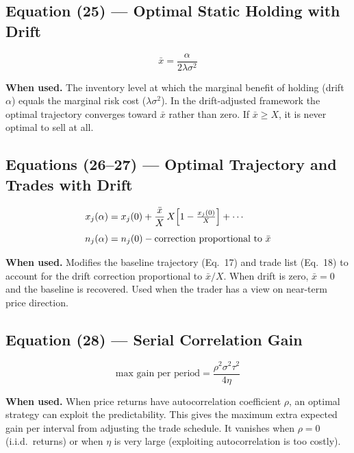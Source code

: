 \documentclass[11pt,a4paper]{article}
\begin{document}
\subsection*{Equation (25) — Optimal Static Holding with Drift}

\begin{equation}
  \bar{x} = \frac{\alpha}{2\lambda\sigma^2}
\end{equation}

\textbf{When used.} The inventory level at which the marginal benefit of holding (drift
$\alpha$) equals the marginal risk cost ($\lambda\sigma^2$).  In the drift-adjusted
framework the optimal trajectory converges toward $\bar{x}$ rather than zero.  If
$\bar{x}\geq X$, it is never optimal to sell at all.

\subsection*{Equations (26--27) — Optimal Trajectory and Trades with Drift}

\begin{align}
  x_j(\alpha) &= x_j(0) + \frac{\bar{x}}{X}\,X\Bigl[1 - \tfrac{x_j(0)}{X}\Bigr] + \cdots \\[4pt]
  n_j(\alpha) &= n_j(0) - \text{correction proportional to }\bar{x}
\end{align}

\textbf{When used.} Modifies the baseline trajectory (Eq.~17) and trade list (Eq.~18) to
account for the drift correction proportional to $\bar{x}/X$.  When drift is zero,
$\bar{x}=0$ and the baseline is recovered.  Used when the trader has a view on near-term
price direction.

\subsection*{Equation (28) — Serial Correlation Gain}

\begin{equation}
  \text{max gain per period} = \frac{\rho^2\sigma^2\tau^2}{4\eta}
\end{equation}

\textbf{When used.} When price returns have autocorrelation coefficient $\rho$, an
optimal strategy can exploit the predictability.  This gives the maximum extra expected
gain per interval from adjusting the trade schedule.  It vanishes when $\rho=0$ (i.i.d.\
returns) or when $\eta$ is very large (exploiting autocorrelation is too costly).
\end{document}
